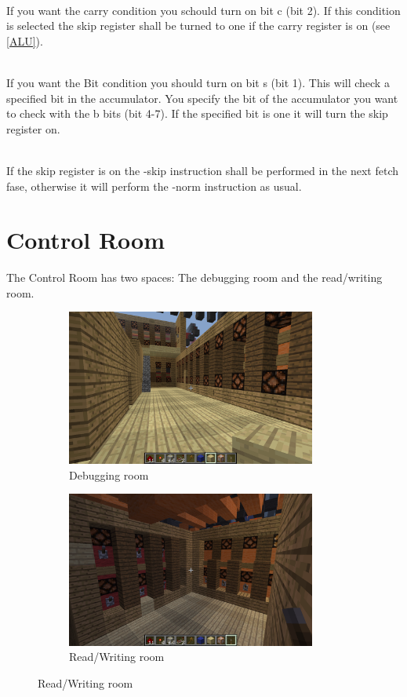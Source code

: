 \documentclass{article}
\begin{document}
~\\
If you want the carry condition you schould turn on bit c (bit 2). If this condition is selected the skip register shall be turned to one if the carry register is on (see \ref{ALU}).

~\\
If you want the Bit condition you should turn on bit s (bit 1). This will check a specified bit in the accumulator. You specify the bit of the accumulator you want to check with the b bits (bit 4-7). If the specified bit is one it will turn the skip register on.

~\\
If the skip register is on the -skip instruction shall be performed in the next fetch fase, otherwise it will perform the -norm instruction as usual.
\section{Control Room\label{UI}}
The Control Room has two spaces: The debugging room and the read/writing room.
\begin{figure}[h]
    \centering
    \begin{subfigure}{0.5\textwidth}
        \centering
        \includegraphics[width=0.9\textwidth]{Debug.png} %
        \caption{Debugging room}
    \end{subfigure}\hfill
    \begin{subfigure}{0.5\textwidth}
        \centering
        \includegraphics[width=0.9\textwidth]{ReadWrite.png} %
        \caption{Read/Writing room}
    \end{subfigure}
\end{figure}
\end{document}
